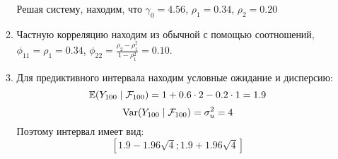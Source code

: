 \begin{enumerate}
\begin{enumerate}
    Решая систему, находим, что $\gamma_0 = 4.56$, $\rho_1 = 0.34$, $\rho_2 = 0.20$

    \item Частную корреляцию находим из обычной с помощью соотношений, $\phi_{11} = \rho_1 = 0.34$, 
    $\phi_{22} = \frac{\rho_2 - \rho_1^2}{1-\rho_1^2} = 0.10$.
    \item Для предиктивного интервала находим условные ожидание и дисперсию: 
    \[
    \operatorname{\mathbb{E}}(Y_{100} \mid \mathcal{F}_{100}) = 1 + 0.6 \cdot 2 - 0.2 \cdot 1 = 1.9
    \]
    \[
    \operatorname{Var}(Y_{100} \mid \mathcal{F}_{100}) = \sigma^2_{u} = 4
    \]
    Поэтому интервал имеет вид:
    \[
    [1.9 - 1.96 \sqrt{4} ; 1.9 + 1.96 \sqrt{4}]  
    \]
  \end{enumerate}
  
  
\end{enumerate}
